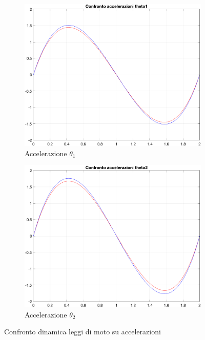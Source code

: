 \begin{figure}[!ht]
\begin{subfigure}{.5\textwidth}
  \centering
  \includegraphics[width=.8\linewidth]{Immagini/confracct1.png}  
  \caption{Accelerazione $\theta_1$}
  \label{fig:sub-first}
\end{subfigure}
\begin{subfigure}{.5\textwidth}
  \centering
  \includegraphics[width=.8\linewidth]{Immagini/confracct2.png}  
  \caption{Accelerazione $\theta_2$}
  \label{fig:sub-second}
\end{subfigure}
\caption{Confronto dinamica leggi di moto su accelerazioni}
\end{figure}

